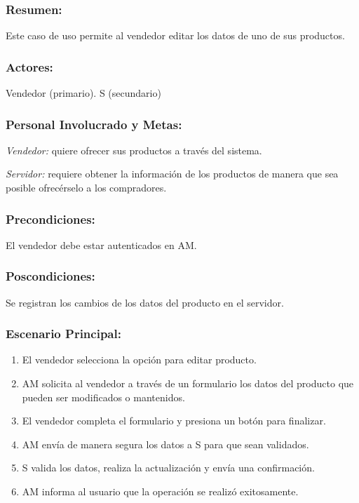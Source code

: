 \begin{framed}


\subsubsection{Resumen:} Este caso de uso permite al vendedor editar los datos de uno de sus productos.


\subsubsection{Actores:} Vendedor (primario). S (secundario)

\subsubsection{Personal Involucrado y Metas:}

\emph{Vendedor:} quiere ofrecer sus productos a través del sistema.

\emph{Servidor:} requiere obtener la información de los  productos de manera que sea posible ofrecérselo a los compradores.

\subsubsection{Precondiciones:} 
El vendedor debe estar autenticados en AM. 

\subsubsection{Poscondiciones:} 
Se registran los cambios de los datos del producto en el servidor.

\subsubsection{Escenario Principal: }

\begin{enumerate}
    \item El vendedor selecciona la opción para editar producto. 
    \item AM solicita al vendedor a través de un formulario los datos del producto que pueden ser modificados o mantenidos.
    \item El vendedor completa el formulario y presiona un botón para finalizar.
    \item AM envía de manera segura los datos a S para que sean validados.
    \item S valida los datos, realiza la actualización y envía una confirmación.
    \item AM informa al usuario que la operación se realizó exitosamente.
\end{enumerate}


\end{framed}
